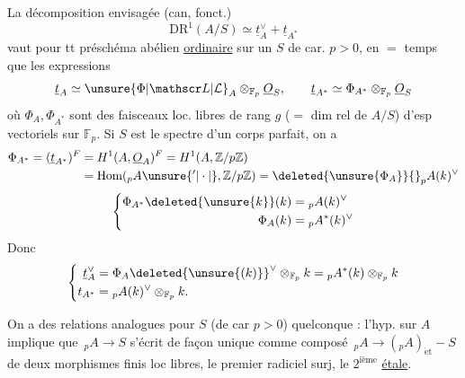 La décomposition envisagée (can, fonct.)
\[
\mathrm{DR}^1(A/S)\simeq\underline{t}_A^\vee+\underline{t}_{A^*}
\]
vaut pour tt préschéma abélien \uline{ordinaire} sur
un $S$ de car. $p>0$, en $=$ temps que les expressions
\[
\underline{t}_A\simeq\unsure{\Phi|\mathscr L|\mathcal L}_A\otimes_{\mathbb F_p}\underline O_S,\qquad
\underline{t}_{A^*}\simeq\Phi_{A^*}\otimes_{\mathbb F_p}\underline O_S
\]
où $\Phi_A,\Phi_{A^*}$ sont des faisceaux  loc. 
libres de rang $g$ ($=$ dim rel de $A/S$) d'esp vectoriels
sur $\mathbb F_p$. Si $S$ est le spectre d'un corps parfait,
on a
\[
\begin{aligned}
\Phi_{A^*}=(\underline t_{A^*})^F&=H^1(A,\underline O_A)^F=H^1(A,\mathbb Z/p\mathbb Z)\\
&=\operatorname{Hom}({}_pA\unsure{'|\cdot|{}},\mathbb Z/p\mathbb Z)=\deleted{\unsure{\Phi_A}}{}_pA(k)^\vee
\end{aligned}
\]
\[
\left\{\begin{aligned}
\Phi_{A^*}\deleted{\unsure{k}}(k)&={}_pA(k)^\vee\\
\Phi_A(k)&={}_pA^*(k)^\vee
\end{aligned}\right.
\]
Donc
\[
\left\{\begin{aligned}
\underline t_A^\vee&=\Phi_A\deleted{\unsure{(k)}}^\vee\otimes_{\mathbb F_p}k={}_p A^*(k)\otimes_{\mathbb F_p}k\\
t_{A^*}&={}_pA(k)^\vee\otimes_{\mathbb F_p}k .
\end{aligned}\right.
\]

On a des relations analogues pour $S$ (de car $p>0$)
quelconque : l'hyp. sur $A$ implique que
$\,{}_pA\mathbin{\to}S$ s'écrit de façon unique comme
composé $\,{}_pA\longrightarrow({}_pA)_{\mathrm{\acute et}}\mathbin{-}S$ de deux morphismes
finis loc libres, le premier radiciel surj, le $2^{\mathrm{ième}}$ \uline{étale}.
